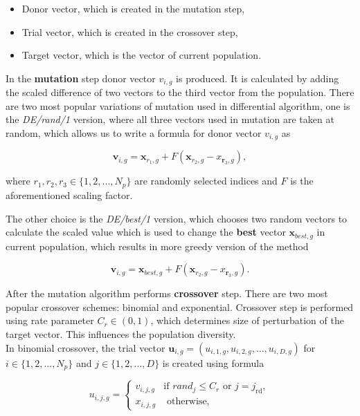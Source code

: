 \documentclass[12pt,a4paper,openany]{book}
\begin{document}
\begin{itemize}
\item Donor vector, which is created in the mutation step,
\item Trial vector, which is created in the crossover step,
\item Target vector, which is the vector of current population.
\end{itemize}


In the \textbf{mutation} step donor vector $v_{i, g}$ is produced. It is calculated by adding the scaled difference of two vectors to the third vector from the population. There are two most popular variations of mutation used in differential algorithm, one is the \textit{DE/rand/1} version, where all three vectors used in mutation are taken at random, which allows us to write a formula for donor vector  $v_{i, g}$ as

\begin{equation}
\mathbf{v}_{i, g}=\mathbf{x}_{r_{1}, g}+F\left(\mathbf{x}_{r_{2}, g}-x_{\mathbf{r}_{3}, g}\right),
\end{equation}

\noindent where $r_{1}, r_{2},r_{3} \in \{1, 2, ..., N_{p}\}$ are randomly selected indices and $F$ is the aforementioned scaling factor.

The other choice is the \textit{DE/best/1} version, which chooses two random vectors to calculate the scaled value which is used to change the \textbf{best} vector $\mathbf{x}_{best, g}$ in current population, which results in more greedy version of the method

\begin{equation}
\mathbf{v}_{i, g}=\mathbf{x}_{best, g}+F\left(\mathbf{x}_{r_{2}, g}-x_{\mathbf{r}_{3}, g}\right).
\end{equation}

After the mutation algorithm performs \textbf{crossover} step. There are two most popular crossover schemes: binomial and exponential. Crossover step is performed using rate parameter $C_{r} \in \left(0, 1\right)$, which determines size of perturbation of the target vector. This influences the population diversity.\\
\indent In binomial crossover, the trial vector $\mathbf{u}_{i, g}=\left(u_{i, 1, g}, u_{i, 2, g}, \ldots, u_{i, D, g}\right)$ for $i \in \{1, 2, ..., N_{p}\}$ and $j \in \{1, 2, ..., D\}$ is created using formula

\begin{equation}
u_{i, j, g}=\left\{\begin{array}{ll}
v_{i, j, g} & \text{if } rand_{j} \leqslant C_{r} \text { or } j=j_{\mathrm{rd}}, \\
x_{i, j, g} & \text { otherwise,}
\end{array}\right.
\end{equation}
\end{document}

